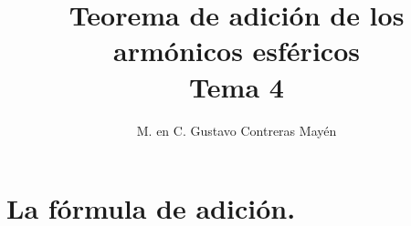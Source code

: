 

\title{Teorema de adición de los armónicos esféricos \\ {\large Tema 4}\vspace{-3ex}}
\author{M. en C. Gustavo Contreras Mayén}
\date{ }

\pagestyle{fancy}
\fancyhf{}
\lhead{\leftmark}
\rfoot{\thepage}
\setlength{\headheight}{16pt}%

\def\changemargin#1#2{\list{}{\rightmargin#2\leftmargin#1}\item[]}
\let\endchangemargin=\endlist 



\maketitle
\fontsize{14}{14}\selectfont
\tableofcontents
\newpage

\section{La fórmula de adición.}

